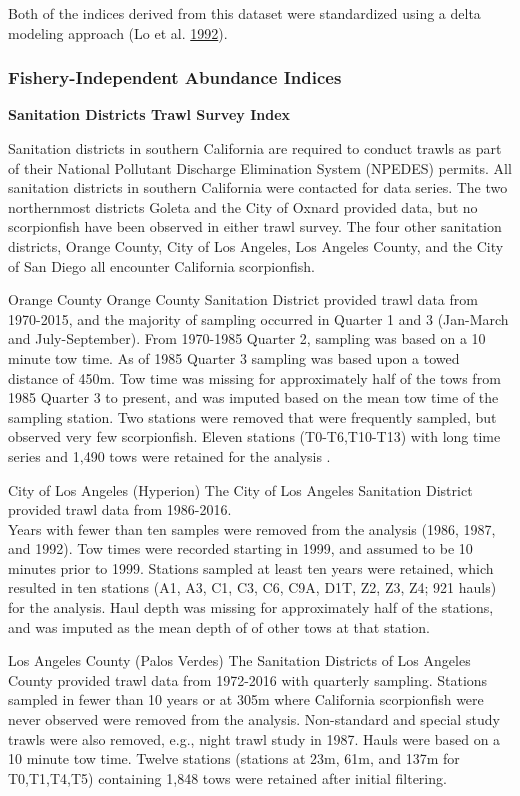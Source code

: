 \documentclass[12pt,]{article}
\begin{document}
Both of the indices derived from this dataset were standardized using a
delta modeling approach (Lo et al.
\protect\hyperlink{ref-Lo1992}{1992}).

\subsubsection{Fishery-Independent Abundance
Indices}\label{fishery-independent-abundance-indices}

\textbf{Sanitation Districts Trawl Survey Index}

Sanitation districts in southern California are required to conduct
trawls as part of their National Pollutant Discharge Elimination System
(NPEDES) permits. All sanitation districts in southern California were
contacted for data series. The two northernmost districts Goleta and the
City of Oxnard provided data, but no scorpionfish have been observed in
either trawl survey. The four other sanitation districts, Orange County,
City of Los Angeles, Los Angeles County, and the City of San Diego all
encounter California scorpionfish.

Orange County Orange County Sanitation District provided trawl data from
1970-2015, and the majority of sampling occurred in Quarter 1 and 3
(Jan-March and July-September). From 1970-1985 Quarter 2, sampling was
based on a 10 minute tow time. As of 1985 Quarter 3 sampling was based
upon a towed distance of 450m. Tow time was missing for approximately
half of the tows from 1985 Quarter 3 to present, and was imputed based
on the mean tow time of the sampling station. Two stations were removed
that were frequently sampled, but observed very few scorpionfish. Eleven
stations (T0-T6,T10-T13) with long time series and 1,490 tows were
retained for the analysis .

City of Los Angeles (Hyperion) The City of Los Angeles Sanitation
District provided trawl data from 1986-2016.\\
Years with fewer than ten samples were removed from the analysis (1986,
1987, and 1992). Tow times were recorded starting in 1999, and assumed
to be 10 minutes prior to 1999. Stations sampled at least ten years were
retained, which resulted in ten stations (A1, A3, C1, C3, C6, C9A, D1T,
Z2, Z3, Z4; 921 hauls) for the analysis. Haul depth was missing for
approximately half of the stations, and was imputed as the mean depth of
of other tows at that station.

Los Angeles County (Palos Verdes) The Sanitation Districts of Los
Angeles County provided trawl data from 1972-2016 with quarterly
sampling. Stations sampled in fewer than 10 years or at 305m where
California scorpionfish were never observed were removed from the
analysis. Non-standard and special study trawls were also removed, e.g.,
night trawl study in 1987. Hauls were based on a 10 minute tow time.
Twelve stations (stations at 23m, 61m, and 137m for T0,T1,T4,T5)
containing 1,848 tows were retained after initial filtering.
\end{document}
